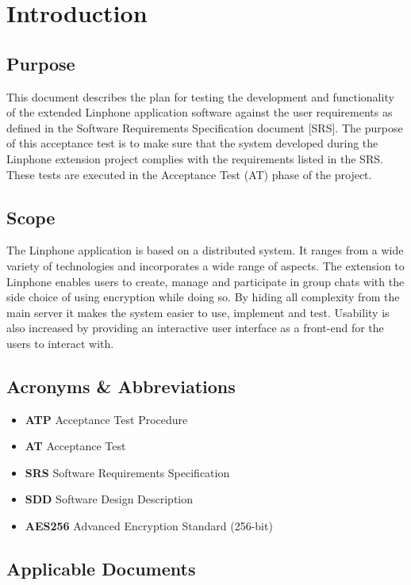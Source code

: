 \documentclass[11pt]{article}
\begin{document}
\section{Introduction}
\subsection{Purpose}
This document describes the plan for testing the development and functionality of the extended Linphone application software against the
user requirements as defined in the Software Requirements Specification document [SRS]. The purpose of this acceptance test is to make sure
that the system developed during the Linphone extension project complies with the requirements listed in the SRS. These tests are executed in the Acceptance Test (AT) phase of the project.

\subsection{Scope}
The Linphone application is based on a distributed system. It ranges from a wide variety of technologies and incorporates a wide range of aspects. The extension to Linphone enables users to create, manage and participate in group chats with the side choice of using encryption while doing so. By hiding all complexity from the main server it makes the system easier to use, implement and test. Usability is also increased by providing an interactive user interface as a front-end for the users to interact with.

\subsection{Acronyms \& Abbreviations}
\begin{itemize}
\item \textbf{ATP} Acceptance Test Procedure
\item \textbf{AT} Acceptance Test
\item \textbf{SRS} Software Requirements Specification
\item \textbf{SDD} Software Design Description
\item \textbf{AES256} Advanced Encryption Standard (256-bit)
\end{itemize}
\subsection{Applicable Documents}
\end{document}
